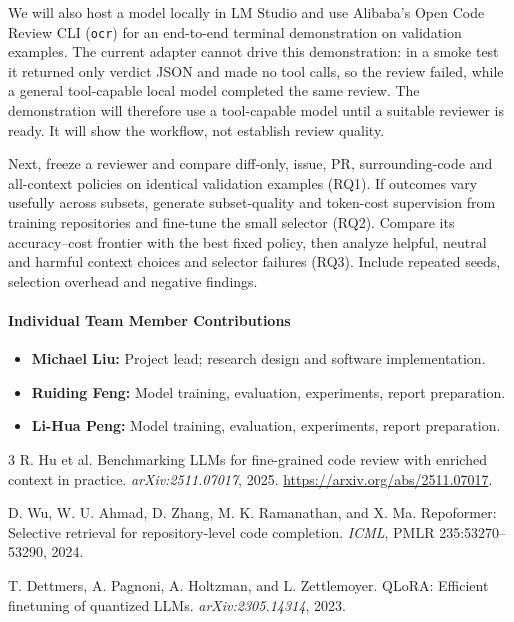 \documentclass{article}
\begin{document}
We will also host a model locally in LM Studio and use Alibaba's Open Code Review CLI (\texttt{ocr}) for an end-to-end terminal demonstration on validation examples. The current adapter cannot drive this demonstration: in a smoke test it returned only verdict JSON and made no tool calls, so the review failed, while a general tool-capable local model completed the same review. The demonstration will therefore use a tool-capable model until a suitable reviewer is ready. It will show the workflow, not establish review quality.

Next, freeze a reviewer and compare diff-only, issue, PR, surrounding-code and all-context policies on identical validation examples (RQ1). If outcomes vary usefully across subsets, generate subset-quality and token-cost supervision from training repositories and fine-tune the small selector (RQ2). Compare its accuracy--cost frontier with the best fixed policy, then analyze helpful, neutral and harmful context choices and selector failures (RQ3). Include repeated seeds, selection overhead and negative findings.

\paragraph{Individual Team Member Contributions}
\begin{itemize}
    \item \textbf{Michael Liu:} Project lead; research design and software implementation.
    \item \textbf{Ruiding Feng:} Model training, evaluation, experiments, report preparation.
    \item \textbf{Li-Hua Peng:} Model training, evaluation, experiments, report preparation.
\end{itemize}

\begin{thebibliography}{3}
R. Hu et al.
\newblock Benchmarking LLMs for fine-grained code review with enriched context in practice.
\newblock \emph{arXiv:2511.07017}, 2025.
\newblock \url{https://arxiv.org/abs/2511.07017}.

D. Wu, W. U. Ahmad, D. Zhang, M. K. Ramanathan, and X. Ma.
\newblock Repoformer: Selective retrieval for repository-level code completion.
\newblock \emph{ICML}, PMLR 235:53270--53290, 2024.

T. Dettmers, A. Pagnoni, A. Holtzman, and L. Zettlemoyer.
\newblock QLoRA: Efficient finetuning of quantized LLMs.
\newblock \emph{arXiv:2305.14314}, 2023.
\end{thebibliography}
\end{document}
